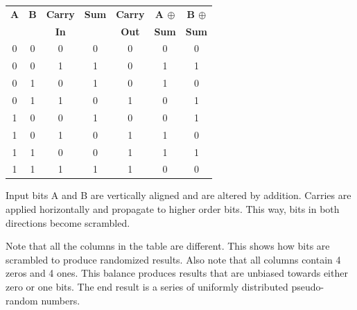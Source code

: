 \documentclass[preprint,natbib]{sigplanconf}
\begin{document}
\noindent
\begin{minipage}{\columnwidth}
    \setlength{\tabcolsep}{.35\tabcolsep}
    \centering
    \begin{tabular}{|c c c|c c|c c|}
        \hline
        \textbf{A} & \textbf{B} & \textbf{Carry} & \textbf{Sum} & \textbf{Carry} & \textbf{A $\oplus$} & \textbf{B $\oplus$} \\
                   &            & \textbf{In}    &              & \textbf{Out}   & \textbf{Sum}        & \textbf{Sum}        \\
        \hline
        0          & 0          & 0              & 0            & 0              & 0                   & 0                   \\
        0          & 0          & 1              & 1            & 0              & 1                   & 1                   \\
        0          & 1          & 0              & 1            & 0              & 1                   & 0                   \\
        0          & 1          & 1              & 0            & 1              & 0                   & 1                   \\
        1          & 0          & 0              & 1            & 0              & 0                   & 1                   \\
        1          & 0          & 1              & 0            & 1              & 1                   & 0                   \\
        1          & 1          & 0              & 0            & 1              & 1                   & 1                   \\
        1          & 1          & 1              & 1            & 1              & 0                   & 0                   \\
        \hline
    \end{tabular}
\end{minipage}

Input bits A and B are vertically aligned and are altered by addition. Carries are applied horizontally and propagate to higher order bits. This way, bits in both directions become scrambled.

Note that all the columns in the table are different. This shows how bits are scrambled to produce randomized results. Also note that all columns contain 4 zeros and 4 ones. This balance produces results that are unbiased towards either zero or one bits. The end result is a series of uniformly distributed pseudo-random numbers.
\end{document}
